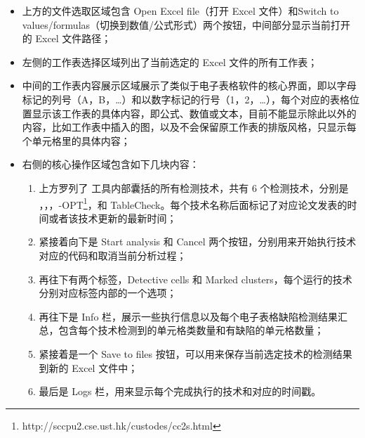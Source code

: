 \begin{itemize}
    \item 上方的文件选取区域包含 Open Excel file（打开 Excel 文件）和Switch to values/formulas（切换到数值/公式形式）两个按钮，中间部分显示当前打开的 Excel 文件路径；
    
    \item 左侧的工作表选择区域列出了当前选定的 Excel 文件的所有工作表；
    
    \item 中间的工作表内容展示区域展示了类似于电子表格软件的核心界面，即以字母标记的列号（A，B，\dots）和以数字标记的行号（1，2，\dots），每个对应的表格位置显示该工作表的具体内容，即公式、数值或文本，目前不能显示除此以外的内容，比如工作表中插入的图，以及不会保留原工作表的排版风格，只显示每个单元格里的具体内容；
    
    \item 右侧的核心操作区域包含如下几块内容：

        \begin{enumerate}
            \item 上方罗列了 \sg 工具内部囊括的所有检测技术，共有 6 个检测技术，分别是 \am\cite{dou2014spreadsheet}，\ca\cite{dou2017cacheck}，\cu\cite{cheung2016custodes}，\cu-OPT\footnote{http://sccpu2.cse.ust.hk/custodes/cc2s.html}，\wa 和 TableCheck\cite{dou2016detecting}。每个技术名称后面标记了对应论文发表的时间或者该技术更新的最新时间；
            
            \item 紧接着向下是 Start analysis 和 Cancel 两个按钮，分别用来开始执行技术对应的代码和取消当前分析过程；
            
            \item 再往下有两个标签，Detective cells 和 Marked clusters，每个运行的技术分别对应标签内部的一个选项；
            
            \item 再往下是 Info 栏，展示一些执行信息以及每个电子表格缺陷检测结果汇总，包含每个技术检测到的单元格类数量和有缺陷的单元格数量；
            
            \item 紧接着是一个 Save to files 按钮，可以用来保存当前选定技术的检测结果到新的 Excel 文件中；
            
            \item 最后是 Logs 栏，用来显示每个完成执行的技术和对应的时间戳。
        \end{enumerate}

\end{itemize}

